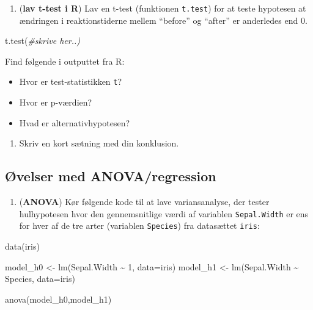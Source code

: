 \documentclass[
]{book}
\newenvironment{Shaded}{\begin{snugshade}}{\end{snugshade}}
\newcommand{\AttributeTok}[1]{\textcolor[rgb]{0.77,0.63,0.00}{#1}}
\newcommand{\CommentTok}[1]{\textcolor[rgb]{0.56,0.35,0.01}{\textit{#1}}}
\newcommand{\DecValTok}[1]{\textcolor[rgb]{0.00,0.00,0.81}{#1}}
\newcommand{\FunctionTok}[1]{\textcolor[rgb]{0.00,0.00,0.00}{#1}}
\newcommand{\NormalTok}[1]{#1}
\newcommand{\OtherTok}[1]{\textcolor[rgb]{0.56,0.35,0.01}{#1}}
\newcommand{\SpecialCharTok}[1]{\textcolor[rgb]{0.00,0.00,0.00}{#1}}
\providecommand{\tightlist}{%
  \setlength{\itemsep}{0pt}\setlength{\parskip}{0pt}}
\begin{document}
\begin{enumerate}
\def\labelenumi{\arabic{enumi})}
\setcounter{enumi}{12}
\tightlist
\item
  (\textbf{lav t-test i R}) Lav en t-test (funktionen \texttt{t.test}) for at teste hypotesen at ændringen i reaktionstiderne mellem ``before'' og ``after'' er anderledes end 0.
\end{enumerate}

\begin{Shaded}
\begin{Highlighting}[]
\FunctionTok{t.test}\NormalTok{(}\CommentTok{\#skrive her..)}
\end{Highlighting}
\end{Shaded}

Find følgende i outputtet fra R:

\begin{itemize}
\tightlist
\item
  Hvor er test-statistikken \texttt{t}?
\item
  Hvor er p-værdien?
\item
  Hvad er alternativhypotesen?
\end{itemize}

\begin{enumerate}
\def\labelenumi{\arabic{enumi})}
\setcounter{enumi}{13}
\tightlist
\item
  Skriv en kort sætning med din konklusion.
\end{enumerate}

\hypertarget{uxf8velser-med-anovaregression}{%
\subsection{Øvelser med ANOVA/regression}\label{uxf8velser-med-anovaregression}}

\begin{enumerate}
\def\labelenumi{\arabic{enumi})}
\setcounter{enumi}{14}
\tightlist
\item
  (\textbf{ANOVA}) Kør følgende kode til at lave variansanalyse, der tester hulhypotesen hvor den gennemsnitlige værdi af variablen \texttt{Sepal.Width} er ens for hver af de tre arter (variablen \texttt{Species}) fra datasættet \texttt{iris}:
\end{enumerate}

\begin{Shaded}
\begin{Highlighting}[]
\FunctionTok{data}\NormalTok{(iris)}

\NormalTok{model\_h0 }\OtherTok{\textless{}{-}} \FunctionTok{lm}\NormalTok{(Sepal.Width }\SpecialCharTok{\textasciitilde{}} \DecValTok{1}\NormalTok{, }\AttributeTok{data=}\NormalTok{iris)}
\NormalTok{model\_h1 }\OtherTok{\textless{}{-}} \FunctionTok{lm}\NormalTok{(Sepal.Width }\SpecialCharTok{\textasciitilde{}}\NormalTok{ Species, }\AttributeTok{data=}\NormalTok{iris)}

\FunctionTok{anova}\NormalTok{(model\_h0,model\_h1)}
\end{Highlighting}
\end{Shaded}
\end{document}
